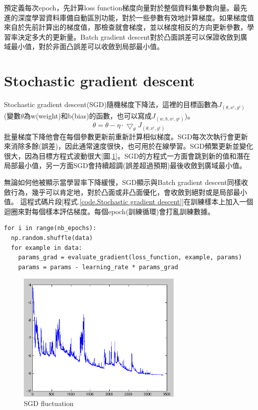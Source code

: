 \documentclass[13pt, a4paper]{report}
\begin{document}
預定義每次epoch，先計算loss function梯度向量對於整個資料集參數向量。最先進的深度學習資料庫備自動區別功能，對於一些參數有效地計算梯度。如果梯度值來自於先前計算出的梯度值，那檢查就會梯度，並以梯度相反的方向更新參數，學習率決定多大的更新量。Batch gradient descent對於凸面誤差可以保證收斂到廣域最小值，對於非面凸誤差可以收斂到局部最小值。
\section{Stochastic gradient descent}
Stochastic gradient descent(SGD)隨機梯度下降法，這裡的目標函數為$J_{(\theta,x^i,y^i)}$(變數$\theta$為w(weight)和b(bias)的函數，也可以寫成$J_{(w, b, x^i, y^i)}$)。
$$\theta=\theta-\eta\cdot\bigtriangledown_{\theta}J_{(\theta, x^i, y^i)}$$
批量梯度下降他會在每個參數更新前重新計算相似梯度。SGD每次次執行會更新來消除多餘(誤差)，因此通常速度很快，也可用於在線學習。SGD頻繁更新並變化很大，因為目標方程式波動很大[圖.\ref{Fig.SGD_fluctuation}]。SGD的方程式一方面會跳到新的值和潛在局部最小值，另一方面SGD會持續超調(誤差超過預期)最後收斂到廣域最小值。

無論如何他被顯示當學習率下降緩慢，SGD顯示與Batch gradient descent同樣收斂行為，幾乎可以肯定地，對於凸面或非凸面優化，會收斂到絕對或是局部最小值。
\newpage
這程式碼片段[程式.\ref{code.Stochastic gradient descent}]在訓練樣本上加入一個迴圈來對每個樣本評估梯度。每個epoch(訓練循環)會打亂訓練數據。
\begin{center}
\begin{lstlisting}[caption=Stochastic gradient descent]
for i in range(nb_epochs):
  np.random.shuffle(data)
  for example in data:
    params_grad = evaluate_gradient(loss_function, example, params)
    params = params - learning_rate * params_grad
\end{lstlisting}
\label{code.Stochastic gradient descent}
\end{center}
\begin{figure}[hbt!]
\center
\includegraphics[width=8cm]{sgd_fluctuation}
\caption{SGD fluctuation \href{https://ruder.io/optimizing-gradient-descent/}{\faLink}} 
\label{Fig.SGD_fluctuation}
\end{figure}
\end{document}
